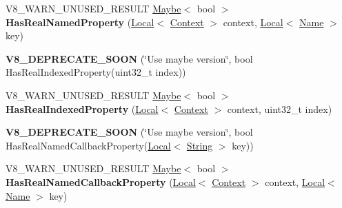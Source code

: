 \begin{DoxyCompactItemize}
\item 
V8\+\_\+\+W\+A\+R\+N\+\_\+\+U\+N\+U\+S\+E\+D\+\_\+\+R\+E\+S\+U\+LT \hyperlink{classv8_1_1Maybe}{Maybe}$<$ bool $>$ {\bfseries Has\+Real\+Named\+Property} (\hyperlink{classv8_1_1Local}{Local}$<$ \hyperlink{classv8_1_1Context}{Context} $>$ context, \hyperlink{classv8_1_1Local}{Local}$<$ \hyperlink{classv8_1_1Name}{Name} $>$ key)\hypertarget{classv8_1_1Object_ad830b937c7586fe2086b288ea79935c4}{}\label{classv8_1_1Object_ad830b937c7586fe2086b288ea79935c4}

\item 
{\bfseries V8\+\_\+\+D\+E\+P\+R\+E\+C\+A\+T\+E\+\_\+\+S\+O\+ON} (\char`\"{}Use maybe version\char`\"{}, bool Has\+Real\+Indexed\+Property(uint32\+\_\+t index))\hypertarget{classv8_1_1Object_abd04e5cb82426a70ebea6afec8687c9e}{}\label{classv8_1_1Object_abd04e5cb82426a70ebea6afec8687c9e}

\item 
V8\+\_\+\+W\+A\+R\+N\+\_\+\+U\+N\+U\+S\+E\+D\+\_\+\+R\+E\+S\+U\+LT \hyperlink{classv8_1_1Maybe}{Maybe}$<$ bool $>$ {\bfseries Has\+Real\+Indexed\+Property} (\hyperlink{classv8_1_1Local}{Local}$<$ \hyperlink{classv8_1_1Context}{Context} $>$ context, uint32\+\_\+t index)\hypertarget{classv8_1_1Object_a46de2f348f4caafca287328ce385ab56}{}\label{classv8_1_1Object_a46de2f348f4caafca287328ce385ab56}

\item 
{\bfseries V8\+\_\+\+D\+E\+P\+R\+E\+C\+A\+T\+E\+\_\+\+S\+O\+ON} (\char`\"{}Use maybe version\char`\"{}, bool Has\+Real\+Named\+Callback\+Property(\hyperlink{classv8_1_1Local}{Local}$<$ \hyperlink{classv8_1_1String}{String} $>$ key))\hypertarget{classv8_1_1Object_ae1ffb11a0fa7549652d0530c0c4c4ca6}{}\label{classv8_1_1Object_ae1ffb11a0fa7549652d0530c0c4c4ca6}

\item 
V8\+\_\+\+W\+A\+R\+N\+\_\+\+U\+N\+U\+S\+E\+D\+\_\+\+R\+E\+S\+U\+LT \hyperlink{classv8_1_1Maybe}{Maybe}$<$ bool $>$ {\bfseries Has\+Real\+Named\+Callback\+Property} (\hyperlink{classv8_1_1Local}{Local}$<$ \hyperlink{classv8_1_1Context}{Context} $>$ context, \hyperlink{classv8_1_1Local}{Local}$<$ \hyperlink{classv8_1_1Name}{Name} $>$ key)\hypertarget{classv8_1_1Object_a62bde6bea1ce32b30b2152f33a105b14}{}\label{classv8_1_1Object_a62bde6bea1ce32b30b2152f33a105b14}


\end{DoxyCompactItemize}
